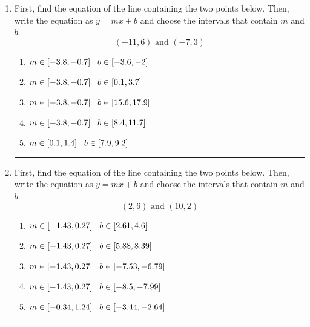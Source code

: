 \documentclass[14pt]{extbook}
\newcommand{\litem}[1]{\item#1\hspace*{-1cm}\rule{\textwidth}{0.4pt}}
\begin{document}
\begin{enumerate}
{\begin{enumerate}[label=\Alph*.]
\end{enumerate} }
\litem{
First, find the equation of the line containing the two points below. Then, write the equation as $ y=mx+b $ and choose the intervals that contain $m$ and $b$.\[ (-11, 6) \text{ and } (-7, 3) \]\begin{enumerate}[label=\Alph*.]
\item \( m \in [-3.8, -0.7] \hspace*{3mm} b \in [-3.6, -2] \)
\item \( m \in [-3.8, -0.7] \hspace*{3mm} b \in [0.1, 3.7] \)
\item \( m \in [-3.8, -0.7] \hspace*{3mm} b \in [15.6, 17.9] \)
\item \( m \in [-3.8, -0.7] \hspace*{3mm} b \in [8.4, 11.7] \)
\item \( m \in [0.1, 1.4] \hspace*{3mm} b \in [7.9, 9.2] \)

\end{enumerate} }
\litem{
First, find the equation of the line containing the two points below. Then, write the equation as $ y=mx+b $ and choose the intervals that contain $m$ and $b$.\[ (2, 6) \text{ and } (10, 2) \]\begin{enumerate}[label=\Alph*.]
\item \( m \in [-1.43, 0.27] \hspace*{3mm} b \in [2.61, 4.6] \)
\item \( m \in [-1.43, 0.27] \hspace*{3mm} b \in [5.88, 8.39] \)
\item \( m \in [-1.43, 0.27] \hspace*{3mm} b \in [-7.53, -6.79] \)
\item \( m \in [-1.43, 0.27] \hspace*{3mm} b \in [-8.5, -7.99] \)
\item \( m \in [-0.34, 1.24] \hspace*{3mm} b \in [-3.44, -2.64] \)


\end{enumerate}}
\end{enumerate}
\end{document}
